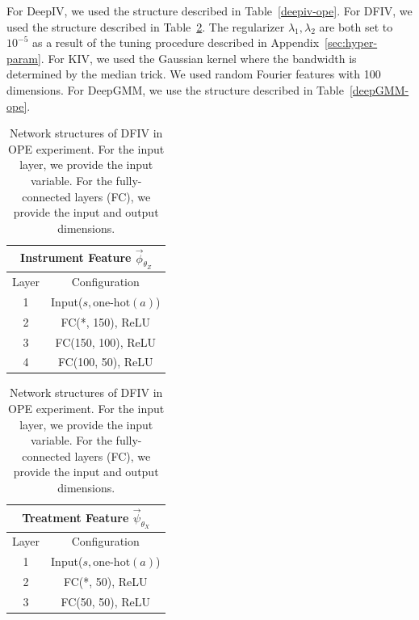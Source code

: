 For DeepIV, we used the structure described in Table~\ref{deepiv-ope}. For DFIV, we used the structure described in Table~\ref{dfiv-ope}. The regularizer $\lambda_1, \lambda_2$ are both set to $10^{-5}$ as a result of the tuning procedure described in Appendix~\ref{sec:hyper-param}. For KIV, we used the Gaussian kernel where the bandwidth is determined by the median trick. We used random Fourier features \citep{Rahimi2008} with 100 dimensions.  For DeepGMM, we use the structure described in Table~\ref{deepGMM-ope}.


\begingroup
\renewcommand{\arraystretch}{1.2}
\begin{table}[t]
    \caption{Network structures of DFIV in OPE experiment. For the input layer, we provide the input variable. For the fully-connected layers (FC), we provide the input and output dimensions.}
    
    \label{dfiv-ope}
    
    \begin{minipage}{0.48\hsize}
        \centering
        \begin{tabular}{cc}
            \multicolumn{2}{c}{\textbf{Instrument Feature} $\vec{\phi}_{\theta_Z}$ }
            \\ \hline
            Layer & Configuration \\ \hline
            1 & Input($s,\text{one-hot}(a)$) \\ \hline
            2 & FC(*, 150), ReLU\\ \hline
            3 & FC(150, 100), ReLU\\ \hline
            4 & FC(100, 50), ReLU \\ \hline
            \end{tabular}    
    \end{minipage}
    \hfill
    \begin{minipage}{0.48\hsize}
        \centering
        \begin{tabular}{cc}
            \multicolumn{2}{c}{\textbf{Treatment Feature} $\vec{\psi}_{\theta_X}$} 
            \\ \hline
            Layer & Configuration \\ \hline
            1 & Input($s, \text{one-hot}(a)$) \\ \hline
            2 & FC(*, 50), ReLU\\ \hline
            3 & FC(50, 50), ReLU\\ \hline
            \end{tabular}    
    \end{minipage}
\end{table}
\endgroup  

